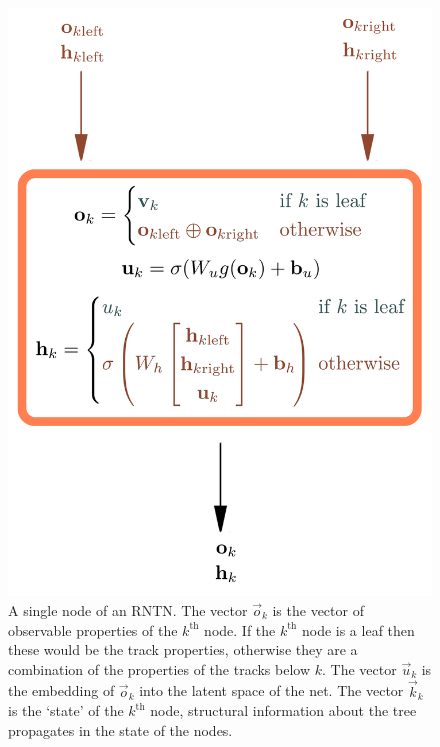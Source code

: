 \begin{figure}[htp]
    \begin{minipage}[c]{0.4\textwidth}
    \includegraphics[width=1.\textwidth]{images/plan_treetagger.png}
    \end{minipage}\hfill
    \begin{minipage}[c]{0.45\textwidth}
    \caption{A single node of an RNTN.
        The vector \(\vec{o}_k\) is the vector of observable properties of the \(k^\text{th}\) node. 
        If the \(k^\text{th}\) node is a leaf then these would be the track properties, otherwise they are a combination of the properties of the tracks below \(k\).
        The vector \(\vec{u}_k\) is the embedding of \(\vec{o}_k\) into the latent space of the net.
        The vector \(\vec{k}_k\) is the `state' of the \(k^\text{th}\) node, structural information about the tree propagates in the state of the nodes.
    }
    \label{fig:plan_treeTagger}
    \end{minipage}
\end{figure}    


